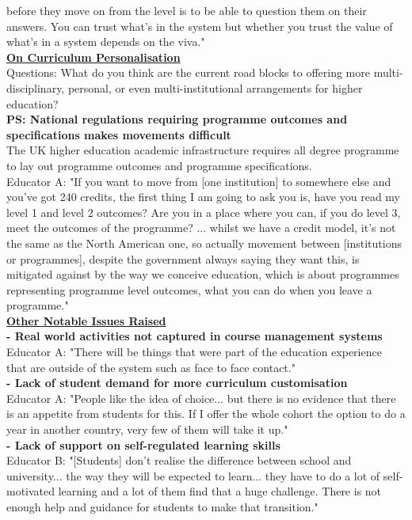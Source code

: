 before they move on from the level is to be able to question them on their answers. You can trust 
what's in the system but whether you trust the value of what's in a system depends on the viva."\vspace{0.25cm}\\
\underline{\textbf{On Curriculum Personalisation}}\\
Questions: What do you think are the current road blocks to offering more multi-disciplinary, personal, 
or even multi-institutional arrangements for higher education?\vspace{0.25cm}\\
\textbf{PS: National regulations requiring programme outcomes and specifications makes movements 
difficult}\\
The UK higher education academic infrastructure requires all degree programme to lay out 
programme outcomes and programme specifications.\\
Educator A: "If you want to move from [one institution] to somewhere else and you’ve got 240 credits, 
the first thing I am going to ask you is, have you read my level 1 and level 2 outcomes? Are you 
in a place where you can, if you do level 3, meet the outcomes of the programme? ... 
whilst we have a credit model, it’s not the same as the North American one, so actually movement 
between [institutions or programmes], despite the government always saying they want this, 
is mitigated against by the way we conceive education, which is about programmes representing 
programme level outcomes, what you can do when you leave a programme."\vspace{0.25cm}\\
\underline{\textbf{Other Notable Issues Raised}}\vspace{0.25cm}\\
\textbf{- Real world activities not captured in course management systems}\\
Educator A: "There will be things that were part of the education experience that are outside of the system
such as face to face contact."\vspace{0.25cm}\\
\textbf{- Lack of student demand for more curriculum customisation}\\
Educator A: "People like the idea of choice... but there is no evidence that there is an appetite 
from students for this. If I offer the whole cohort the option to do a year in another country,
very few of them will take it up."\vspace{0.25cm}\\
\textbf{- Lack of support on self-regulated learning skills}\\
Educator B: "[Students] don't realise the difference between school and university... the way they will
be expected to learn... they have to do a lot of self-motivated learning and a lot of them find that a 
huge challenge. There is not enough help and guidance for students to make that transition."

